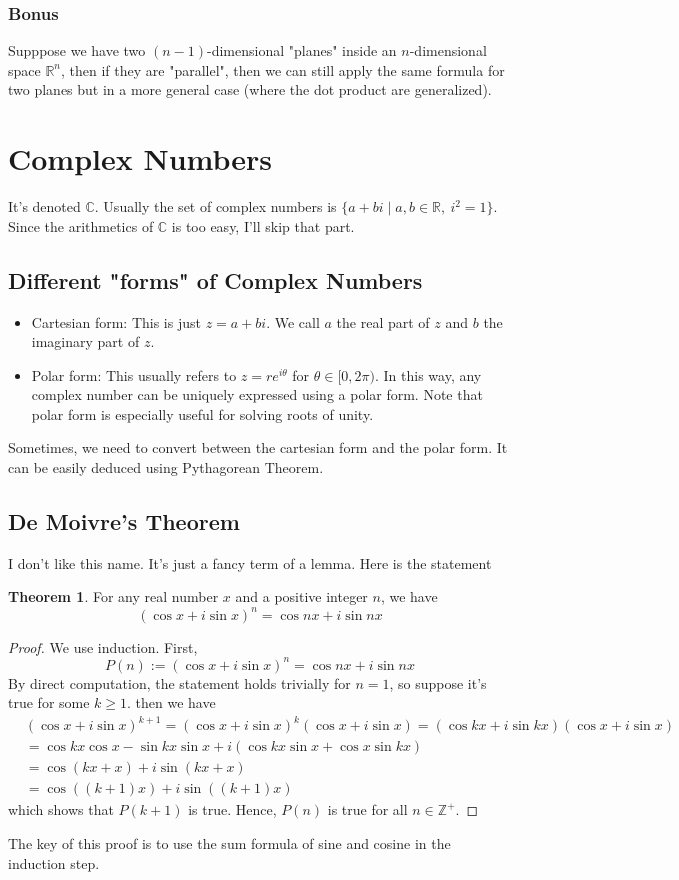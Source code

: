 \documentclass{article}
\theoremstyle{definition}
\theoremstyle{definition}
\theoremstyle{definition}
\theoremstyle{definition}
\theoremstyle{definition}
\theoremstyle{definition}
\theoremstyle{definition}
\theoremstyle{definition}
\theoremstyle{definition}
\newtheorem{theorem}{Theorem}[section]
\newcommand{\RR}{\mathbb{R}}
\newcommand{\ZZ}{\mathbb{Z}}
\newcommand{\CC}{\mathbb{C}}
\begin{document}
\subsubsection{Bonus}
Supppose we have two $(n-1)$-dimensional "planes" inside an $n$-dimensional space $\RR^n$, then if they are "parallel", then we can still apply the same formula for two planes but in a more general case (where the dot product are generalized). 

\section{Complex Numbers}
It's denoted $\CC$. Usually the set of complex numbers is $\{a+bi\mid a,b\in\RR,\ i^2=1\}$. Since the arithmetics of $\CC$ is too easy,
I'll skip that part.
\subsection{Different "forms" of Complex Numbers}
\begin{itemize}
    \item Cartesian form: This is just $z=a+bi$. We call $a$ the real part of $z$ and $b$ the imaginary part of $z$.
    \item Polar form: This usually refers to $z=re^{i\theta}$ for $\theta\in[0,2\pi)$. In this way, any complex number can be uniquely expressed using a polar form. Note that polar form is especially useful for solving roots of unity.
\end{itemize}
Sometimes, we need to convert between the cartesian form and the polar form. It can be easily deduced using Pythagorean Theorem.
\subsection{De Moivre's Theorem}
I don't like this name. It's just a fancy term of a lemma. Here is the statement
\begin{theorem}
    For any real number $x$ and a positive integer $n$, we have \[(\cos x+i\sin x)^n=\cos nx+i\sin nx\]
\end{theorem}
\begin{proof}
    We use induction. First,
    \[
    P(n):= (\cos x+i\sin x)^n=\cos nx+i\sin nx 
    \]
    By direct computation, the statement holds trivially for $n=1$, so suppose it's true for some $k\ge1$.
    then we have
    \begin{align*}
        &(\cos x+i\sin x)^{k+1}=(\cos x+i\sin x)^k(\cos x+i\sin x)=(\cos kx+i\sin kx)(\cos x+i\sin x)\\
        &=\cos kx\cos x-\sin kx\sin x+i(\cos kx\sin x+\cos x\sin kx)\\
        &=\cos(kx+x)+i\sin(kx+x)\\
        &=\cos((k+1)x)+i\sin((k+1)x)
    \end{align*}
    which shows that $P(k+1)$ is true. Hence, $P(n)$ is true for all $n\in\ZZ^+$.
\end{proof}
The key of this proof is to use the sum formula of sine and cosine in the induction step.
\end{document}
